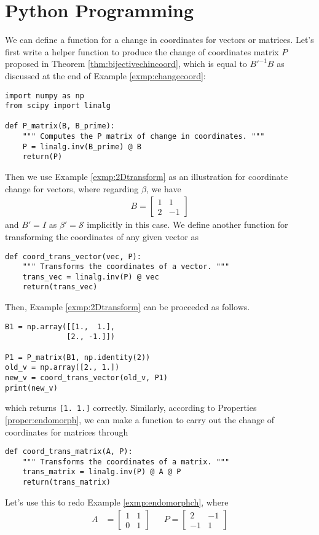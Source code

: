 \section{Python Programming}
We can define a function for a change in coordinates for vectors or matrices. Let's first write a helper function to produce the change of coordinates matrix $P$ proposed in Theorem \ref{thm:bijectivechincoord}, which is equal to $B'^{-1}B$ as discussed at the end of Example \ref{exmp:changecoord}:
\begin{lstlisting}
import numpy as np
from scipy import linalg

def P_matrix(B, B_prime):
    """ Computes the P matrix of change in coordinates. """
    P = linalg.inv(B_prime) @ B
    return(P)
\end{lstlisting}
Then we use Example \ref{exmp:2Dtransform} as an illustration for coordinate change for vectors, where regarding $\mathcal{\beta}$, we have
\begin{align*}
B = 
\begin{bmatrix}
1 & 1 \\ 
2 & -1
\end{bmatrix}
\end{align*}
and $B' = I$ as $\mathcal{\beta}' = \mathcal{S}$ implicitly in this case. We define another function for transforming the coordinates of any given vector as
\begin{lstlisting}
def coord_trans_vector(vec, P):
    """ Transforms the coordinates of a vector. """
    trans_vec = linalg.inv(P) @ vec
    return(trans_vec)
\end{lstlisting}
Then, Example \ref{exmp:2Dtransform} can be proceeded as follows.
\begin{lstlisting}
B1 = np.array([[1.,  1.], 
              [2., -1.]])

P1 = P_matrix(B1, np.identity(2))
old_v = np.array([2., 1.])
new_v = coord_trans_vector(old_v, P1)
print(new_v)
\end{lstlisting}
which returns \verb|[1. 1.]| correctly. Similarly, according to Properties \ref{proper:endomorph}, we can make a function to carry out the change of coordinates for matrices through
\begin{lstlisting}
def coord_trans_matrix(A, P):
    """ Transforms the coordinates of a matrix. """
    trans_matrix = linalg.inv(P) @ A @ P
    return(trans_matrix)
\end{lstlisting}
Let's use this to redo Example \ref{exmp:endomorphch}, where
\begin{align*}
A &= 
\begin{bmatrix}
1 & 1 \\
0 & 1
\end{bmatrix} &
& P=
\begin{bmatrix}
2 & -1 \\
-1 & 1
\end{bmatrix}
\end{align*}
